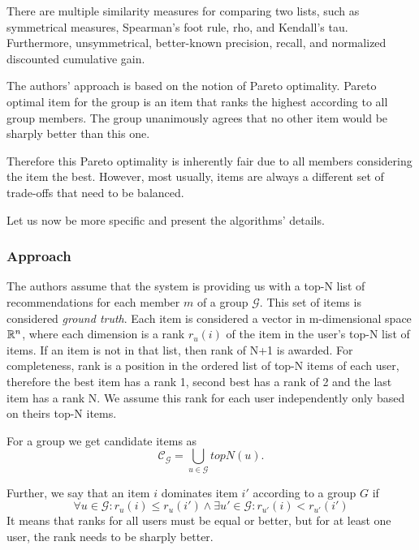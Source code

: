 There are multiple similarity measures for comparing two lists, such as symmetrical measures, Spearman's foot rule, rho, and Kendall's tau. Furthermore, unsymmetrical, better-known precision, recall, and normalized discounted cumulative gain.

The authors' approach is based on the notion of Pareto optimality. Pareto optimal item for the group is an item that ranks the highest according to all group members. The group unanimously agrees that no other item would be sharply better than this one.

Therefore this Pareto optimality is inherently fair due to all members considering the item the best. However, most usually, items are always a different set of trade-offs that need to be balanced.

Let us now be more specific and present the algorithms' details.

\subsubsection{Approach}

The authors assume that the system is providing us with a top-N list of recommendations for each member $m$ of a group $\mathcal{G}$. This set of items is considered \textit{ground truth}. Each item is considered a vector in m-dimensional space $\mathbb{R}^n$, where each dimension is a rank $r_u(i)$ of the item in the user's top-N list of items. If an item is not in that list, then rank of N+1 is awarded. For completeness, rank is a position in the ordered list of top-N items of each user, therefore the best item has a rank 1, second best has a rank of 2 and the last item has a rank N. We assume this rank for each user independently only based on theirs top-N items.

For a group we get candidate items as
\begin{equation} \label{eq:top-N_candidates}
    \mathcal{C}_\mathcal{G} = \bigcup_{u\in \mathcal{G}} \mathit{topN}(u).
\end{equation}


Further, we say that an item $i$ dominates item $i'$ according to a group $G$ if
\begin{equation}
\forall u \in \mathcal{G}: r_u(i) \leq r_u(i') 	\land \exists u' \in \mathcal{G}: r_{u'}(i) < r_{u'}(i') 
\end{equation}
It means that ranks for all users must be equal or better, but for at least one user, the rank needs to be sharply better.

